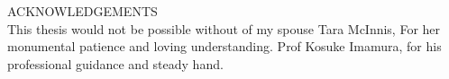 ACKNOWLEDGEMENTS\\

This thesis would not be possible without of my spouse Tara McInnis, For her monumental patience and loving understanding.  Prof Kosuke Imamura, for his professional guidance and steady hand.

\newpage
